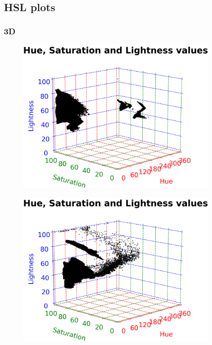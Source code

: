 \subsection{HSL plots}

\subsubsection{3D}

\begin{figure}[h!]
	\centering
	\begin{minipage}{0.5\textwidth}
		\centering
		\includegraphics[width=0.9\textwidth]{img/hsl3DRed.png}
		\captionsetup{width=0.9\textwidth}
		\label{hsl3DRedPlot}
	\end{minipage}%
	\begin{minipage}{0.5\textwidth}
		\centering
		\includegraphics[width=0.9\textwidth]{img/hsl3DYellow.png}
		\captionsetup{width=0.9\textwidth}
		\label{hsl3DYellowPlot}
	\end{minipage}
\end{figure}


